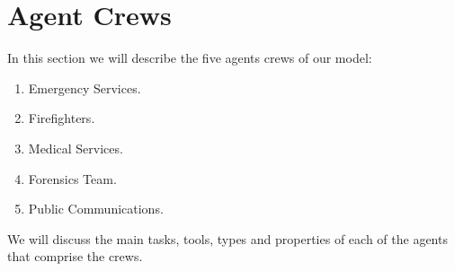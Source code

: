 \section{Agent Crews}\label{sec:agents}
In this section we will describe the five agents crews of our model:
\begin{enumerate}
    \item Emergency Services.
    \item Firefighters.
    \item Medical Services.
    \item Forensics Team.
    \item Public Communications.
\end{enumerate}
We will discuss the main tasks, tools, types and properties of each of the agents that comprise the crews.





